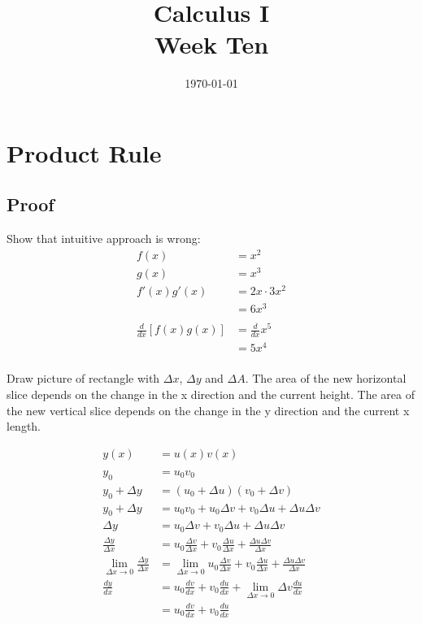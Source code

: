 \documentclass[letterpaper, landscape]{exam}
\title{Calculus I \\ Week Ten}
\author{}
\date{\today}
\begin{document}
  \maketitle
  \tableofcontents

  \section{Product Rule} %
  \label{sec:pr}
  
  \subsection{Proof} %
  \label{sub:pr.proof}
  
  Show that intuitive approach is wrong:
  \begin{align*}
    f(x)                       & = x^2 \\
    g(x)                       & = x^3 \\
    f'(x) g'(x)                & = 2x \cdot 3x^2 \\
                               & = 6x^3 \\
    \\
    \frac{d}{dx} [ f(x) g(x) ] & = \frac{d}{dx} x^5 \\
                               & = 5x^4 \\
  \end{align*}

  Draw picture of rectangle with $\Delta x$, $\Delta y$ and $\Delta A$. The area
  of the new horizontal slice depends on the change in the x direction and the
  current height. The area of the new vertical slice depends on the change in
  the y direction and the current x length.

  \begin{align*}
    y(x)                      & = u(x) v(x) \\
    \\
    y_0                       & = u_0 v_0 \\
    y_0 + \Delta y            & = (u_0 + \Delta u) (v_0 + \Delta v) \\
    y_0 + \Delta y            & = u_0 v_0 + u_0 \Delta v + v_0 \Delta u + \Delta u \Delta v \\
    \Delta y                  & = u_0 \Delta v + v_0 \Delta u + \Delta u \Delta v \\
    \frac{\Delta y}{\Delta x} & = u_0 \frac{\Delta v}{\Delta x} + v_0 \frac{\Delta u}{\Delta x} + \frac{\Delta u \Delta v}{\Delta x} \\
    \lim_{\Delta x \to 0} \frac{\Delta y}{\Delta x} & = \lim_{\Delta x \to 0} u_0 \frac{\Delta v}{\Delta x} 
      + v_0 \frac{\Delta u}{\Delta x} + \frac{\Delta u \Delta v}{\Delta x} \\
    \frac{dy}{dx} & = u_0 \frac{dv}{dx} + v_0 \frac{du}{dx} + \lim_{\Delta x \to 0} \Delta v \frac{du}{dx} \\
                  & = u_0 \frac{dv}{dx} + v_0 \frac{du}{dx} \\
  \end{align*}
\end{document}
